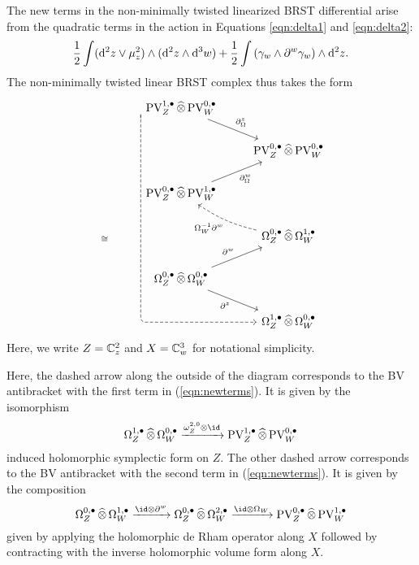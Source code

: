 The new terms in the non-minimally twisted linearized BRST differential arise from the quadratic terms in the action in Equations \eqref{eqn:delta1} and \eqref{eqn:delta2}:
\begin{equation}\label{eqn:newterms}
  \frac{1}{2} \int ({\rm d}^2 z \vee \mu_z^2) \wedge ({\rm d}^2 z \wedge {\rm d}^3 w) + \frac{1}{2} \int \left(\gamma_w \wedge \partial^w \gamma_w \right) \wedge {\rm d}^2 z .
\end{equation}
The non-minimally twisted linear BRST complex thus takes the form
\[
  \begin{tikzcd}
  & \PV^{1,\bu}_Z \hotimes \PV^{0,\bu}_W \ar[dr, "\div^z"] \ar[dashed, rounded corners, to path={ -- ([yshift=-2ex]\tikztostart.west) |- ([xshift=-1.5ex]\tikztotarget.west) -- (\tikztotarget)}, dddddr]\\
  & & \PV^{0,\bu}_Z \hotimes \PV^{0,\bu}_W \\
 & \PV^{0,\bu}_Z \hotimes \PV^{1,\bu}_W \ar[ur, "\div^w"'] & \\
\;_{\cong}  & & \Omega^{0,\bu}_Z \hotimes \Omega^{1,\bu}_W \ar[ul, dashed, bend left = 10, "\Omega^{-1}_W \partial^w"]\\
 & \Omega^{0,\bu}_Z \hotimes \Omega^{0,\bu}_W \ar[ur, "\partial^w"] \ar[dr,"\partial^z"'] \\
  & & \Omega^{1,\bu}_Z \hotimes \Omega^{0,\bu}_W
  \end{tikzcd}
\]
Here, we write $Z = \mathbb C^2_z$ and $X = \mathbb C^3_w$ for notational simplicity. 

Here, the dashed arrow along the outside of the diagram corresponds to the BV antibracket with the first term in (\ref{eqn:newterms}).
It is given by the isomorphism 
\[
\Omega^{1,\bu}_Z \hotimes \Omega^{0,\bu}_W \xto{\omega^{2,0}_Z \otimes \id} \PV^{1,\bu}_Z \hotimes \PV^{0,\bu}_W
\]
induced holomorphic symplectic form on $Z$. 
The other dashed arrow corresponds to the BV antibracket with the second term in (\ref{eqn:newterms}).
It is given by the composition
\[
\Omega^{0,\bu}_Z \hotimes \Omega^{1,\bu}_W \xto{\id \otimes \del^w} \Omega^{0,\bu}_Z \hotimes \Omega^{2,\bu}_W \xto{\id \otimes \Omega_W} \PV^{0,\bu}_Z \hotimes \PV^{1,\bu}_W
\]
given by applying the holomorphic de Rham operator along $X$ followed by contracting with the inverse holomorphic volume form along $X$. 

